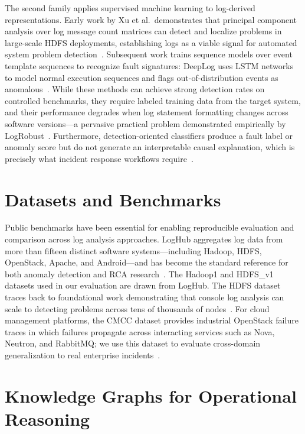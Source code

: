 The second family applies supervised machine learning to log-derived representations. Early work
by Xu et al.\ demonstrates that principal component analysis over log message count matrices can
detect and localize problems in large-scale HDFS deployments, establishing logs as a viable signal
for automated system problem detection~\cite{xu2009consolelogs}. Subsequent work trains sequence
models over event template sequences to recognize fault signatures: DeepLog uses LSTM networks to
model normal execution sequences and flags out-of-distribution events as
anomalous~\cite{du2017deeplog}. While these methods can achieve strong detection rates on
controlled benchmarks, they require labeled training data from the target system, and their
performance degrades when log statement formatting changes across software versions---a pervasive
practical problem demonstrated empirically by LogRobust~\cite{zhang2019logrobust}. Furthermore,
detection-oriented classifiers produce a fault label or anomaly score but do not generate an
interpretable causal explanation, which is precisely what incident response workflows
require~\cite{chen2024rcacopilot}.

\section{Datasets and Benchmarks}

Public benchmarks have been essential for enabling reproducible evaluation and comparison across
log analysis approaches. LogHub aggregates log data from more than fifteen distinct software
systems---including Hadoop, HDFS, OpenStack, Apache, and Android---and has become the standard
reference for both anomaly detection and RCA research~\cite{he2020loghub}. The Hadoop1 and
HDFS\_v1 datasets used in our evaluation are drawn from LogHub. The HDFS dataset traces back to
foundational work demonstrating that console log analysis can scale to detecting problems across
tens of thousands of nodes~\cite{xu2009consolelogs}. For cloud management platforms, the CMCC
dataset provides industrial OpenStack failure traces in which failures propagate across interacting
services such as Nova, Neutron, and RabbitMQ; we use this dataset to evaluate cross-domain
generalization to real enterprise incidents~\cite{cui2025aetherlog}.

\section{Knowledge Graphs for Operational Reasoning}


